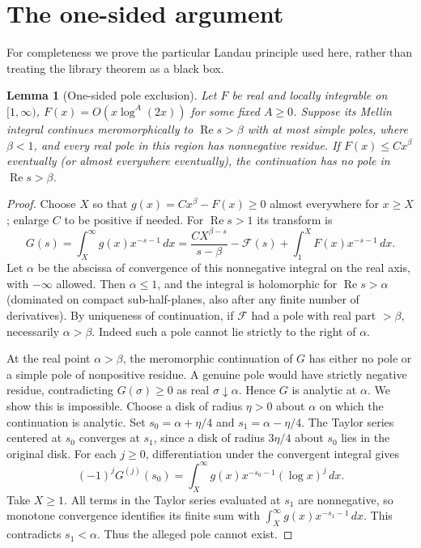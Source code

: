 \documentclass[11pt]{article}
\newtheorem{lemma}[theorem]{Lemma}
\theoremstyle{definition}\newtheorem{definition}[theorem]{Definition}
\newcommand{\Rea}{\operatorname{Re}}
\begin{document}
\section{The one-sided argument}
For completeness we prove the particular Landau principle used here, rather than treating the library theorem as a black box.
\begin{lemma}[One-sided pole exclusion]\label{lem:landau}
Let $F$ be real and locally integrable on $[1,\infty)$, $F(x)=O(x\log^A(2x))$ for some fixed $A\ge0$. Suppose its Mellin integral continues meromorphically to $\Rea s>\beta$ with at most simple poles, where $\beta<1$, and every real pole in this region has nonnegative residue. If $F(x)\le Cx^\beta$ eventually (or almost everywhere eventually), the continuation has no pole in $\Rea s>\beta$.
\end{lemma}
\begin{proof}
Choose $X$ so that $g(x)=Cx^\beta-F(x)\ge0$ almost everywhere for $x\ge X$; enlarge $C$ to be positive if needed. For $\Rea s>1$ its transform is
\[
 G(s)=\int_X^\infty g(x)x^{-s-1}\,dx
 =\frac{CX^{\beta-s}}{s-\beta}-\mathcal F(s)+\int_1^X F(x)x^{-s-1}\,dx.
\]
Let $\alpha$ be the abscissa of convergence of this nonnegative integral on the real axis, with $-\infty$ allowed. Then $\alpha\le1$, and the integral is holomorphic for $\Rea s>\alpha$ (dominated on compact sub-half-planes, also after any finite number of derivatives). By uniqueness of continuation, if $\mathcal F$ had a pole with real part $>\beta$, necessarily $\alpha>\beta$. Indeed such a pole cannot lie strictly to the right of $\alpha$.

At the real point $\alpha>\beta$, the meromorphic continuation of $G$ has either no pole or a simple pole of nonpositive residue. A genuine pole would have strictly negative residue, contradicting $G(\sigma)\ge0$ as real $\sigma\downarrow\alpha$. Hence $G$ is analytic at $\alpha$. We show this is impossible. Choose a disk of radius $\eta>0$ about $\alpha$ on which the continuation is analytic. Set $s_0=\alpha+\eta/4$ and $s_1=\alpha-\eta/4$. The Taylor series centered at $s_0$ converges at $s_1$, since a disk of radius $3\eta/4$ about $s_0$ lies in the original disk. For each $j\ge0$, differentiation under the convergent integral gives
\[
 (-1)^jG^{(j)}(s_0)=\int_X^\infty g(x)x^{-s_0-1}(\log x)^j\,dx.
\]
Take $X\ge1$. All terms in the Taylor series evaluated at $s_1$ are nonnegative, so monotone convergence identifies its finite sum with $\int_X^\infty g(x)x^{-s_1-1}\,dx$. This contradicts $s_1<\alpha$. Thus the alleged pole cannot exist.
\end{proof}
\end{document}

